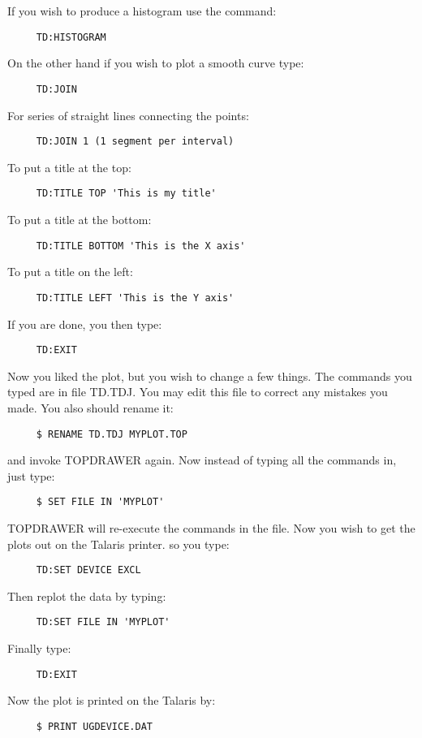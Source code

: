 If you wish to produce a histogram use the command:  
\begin{verbatim}
     TD:HISTOGRAM 
\end{verbatim}
On the other hand if you wish to plot a smooth curve type:  
\begin{verbatim}
     TD:JOIN 
\end{verbatim}
For series of straight lines connecting the points:  
\begin{verbatim}
     TD:JOIN 1 (1 segment per interval) 
\end{verbatim}
To put a title at the top:  
\begin{verbatim}
     TD:TITLE TOP 'This is my title' 
\end{verbatim}
To put a title at the bottom:  
\begin{verbatim}
     TD:TITLE BOTTOM 'This is the X axis' 
\end{verbatim}
To put a title on the left:  
\begin{verbatim}
     TD:TITLE LEFT 'This is the Y axis' 
\end{verbatim}

If you are done, you then type:  
\begin{verbatim}
     TD:EXIT 
\end{verbatim}

Now you liked the plot, but you wish to change a few things.  The commands
you typed are in file TD.TDJ.  You may edit this file to correct any
mistakes you made.  You also should rename it:  
\begin{verbatim}
     $ RENAME TD.TDJ MYPLOT.TOP 
\end{verbatim}
and invoke TOPDRAWER again.  Now instead of typing all the commands in,
just type:  
\begin{verbatim}
     $ SET FILE IN 'MYPLOT' 
\end{verbatim}
TOPDRAWER will re-execute the commands in the file.  Now you wish to get
the plots out on the Talaris printer.  so you type:  
\begin{verbatim}
     TD:SET DEVICE EXCL 
\end{verbatim}
Then replot the data by typing:  
\begin{verbatim}
     TD:SET FILE IN 'MYPLOT' 
\end{verbatim}
Finally type:  
\begin{verbatim}
     TD:EXIT 
\end{verbatim}

Now the plot is printed on the Talaris by:  
\begin{verbatim}
     $ PRINT UGDEVICE.DAT 
\end{verbatim}


